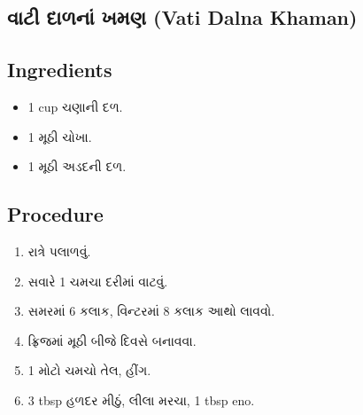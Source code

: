 \documentclass[../../recipes.tex]{subfiles}
\begin{document}
\begin{gujarati}

\chapter{વાટી દાળનાં ખમણ (Vati Dalna Khaman)}

\section*{Ingredients}

\begin{itemize}
    \item 1 cup ચણાની દળ.
    \item 1 મૂઠી ચોખા.
    \item 1 મૂઠી અડદની દળ.
\end{itemize}

\noindent
\section*{Procedure}

\begin{enumerate}
    \item રાત્રે પલાળવું.
    \item સવારે 1 ચમચા દરીમાં વાટવું.
    \item સમરમાં 6 કલાક, વિન્ટરમાં 8 કલાક આથો લાવવો.
    \item ફ્રિજમાં મૂઠી બીજે દિવસે બનાવવા.
    \item 1 મોટો ચમચો તેલ, હીંગ.
    \item 3 tbsp હળદર મીઠું, લીલા મરચા, 1 tbsp eno.
\end{enumerate}

\end{gujarati}
\end{document}
